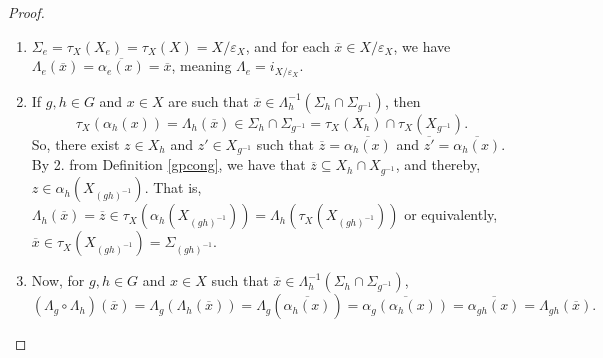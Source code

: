 \documentclass[sn-mathphys-num]{sn-jnl}%
\theoremstyle{thmstyleone}%
\theoremstyle{thmstyletwo}%
\theoremstyle{thmstylethree}%
\begin{document}
\begin{proof}
\begin{enumerate}
\item $ \Sigma_e = \tau_X (X_e) = \tau_X (X) = X / \varepsilon_X $, and for each $ \overline {x} \in X / \varepsilon_X $, we have
$ \Lambda_e (\overline {x}) = \overline {\alpha_e (x)} = \overline {x}$, meaning $ \Lambda_e = i_{X / \varepsilon_X} $.

\item If $ g, h \in G $ and $ x \in X $ are such that $ \overline {x} \in \Lambda_h^{-1} (\Sigma_h \cap \Sigma_{g^{-1}}) $, then $$ \tau_X(\alpha_h (x))=\Lambda_h (\overline {x}) \in \Sigma_h \cap \Sigma_{g^{-1}} = \tau_X(X_h) \cap  \tau_X(X_{g^{-1}}).$$ 
So, there exist $z\in X_h$ and $z'\in X_{g^{-1}}$ such that $\overline{z}=\overline{\alpha_h(x)}$ and $\overline{z'}=\overline{\alpha_h(x)}$. 
By 2. from Definition \ref{gpcong}, we have that $\overline{z}\subseteq X_h\cap X_{g^{-1}}$, and thereby, $z\in \alpha_h(X_{(gh)^{-1}})$. That is, 
$\Lambda_h (\overline {x})=\overline{z}\in \tau_X(\alpha_h(X_{(gh)^{-1}}))=\Lambda_h(\tau_X(X_{(gh)^{-1}}))$ or equivalently, 
$\overline {x}\in \tau_X(X_{(gh)^{-1}})=\Sigma_{(gh)^{-1}}$.
\item Now, for $ g, h \in G $ and $ x \in X $ such that  $ \overline{x} \in \Lambda_h^{- 1} (\Sigma_h \cap \Sigma_{g^{ -1}})$,
$$ (\Lambda_g \circ \Lambda_h) (\overline{x}) = \Lambda_g(\Lambda_h (\overline{x})) =  \Lambda_g (\overline{\alpha_h (x)}) = \overline{\alpha_g (\alpha_h (x))} = \overline{\alpha_{gh} (x)} = \Lambda_{gh} (\overline{x}). $$


\end{enumerate}
\end{proof}
\end{document}
